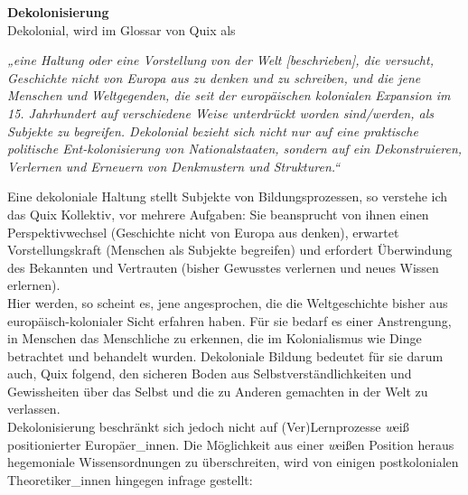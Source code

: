 \noindent\textbf{\large Dekolonisierung}\\
Dekolonial, wird im Glossar von Quix\footnotemark{} als
\begin{myenv} \textit{„eine Haltung oder eine Vorstellung von der Welt
  [beschrieben], die versucht, Geschichte nicht von Europa aus zu denken und zu
schreiben, und die jene Menschen und Weltgegenden, die seit der europäischen
kolonialen Expansion im 15. Jahrhundert auf verschiedene Weise unterdrückt
worden sind/werden, als Subjekte zu begreifen. Dekolonial bezieht sich nicht
nur auf eine praktische politische Ent-kolonisierung von Nationalstaaten,
sondern auf ein Dekonstruieren, Verlernen und Erneuern von Denkmustern und
Strukturen.“\footnotemark{}} \end{myenv}
Eine dekoloniale Haltung stellt Subjekte von Bildungsprozessen, so verstehe ich
das Quix Kollektiv, vor mehrere Aufgaben: Sie beansprucht von ihnen einen
Perspektivwechsel (Geschichte nicht von Europa aus denken), erwartet
Vorstellungskraft (Menschen als Subjekte begreifen) und erfordert Überwindung
des Bekannten und Vertrauten (bisher Gewusstes verlernen und neues Wissen
erlernen).\\
Hier werden, so scheint es, jene angesprochen, die die Weltgeschichte bisher
aus europäisch-kolonialer Sicht erfahren haben. Für sie bedarf es einer
Anstrengung, in Menschen das Menschliche zu erkennen, die im Kolonialismus wie
Dinge betrachtet und behandelt wurden. Dekoloniale Bildung bedeutet für sie
darum auch, Quix folgend, den sicheren Boden aus Selbstverständlichkeiten und
Gewissheiten über das Selbst und die zu Anderen gemachten in der Welt zu
verlassen.\\
Dekolonisierung beschränkt sich jedoch nicht auf (Ver)Lernprozesse \textit{w}eiß
positionierter Europäer\_innen. Die Möglichkeit aus einer \textit{w}eißen Position heraus
hegemoniale Wissensordnungen zu überschreiten, wird von einigen postkolonialen
Theoretiker\_innen hingegen infrage gestellt:


